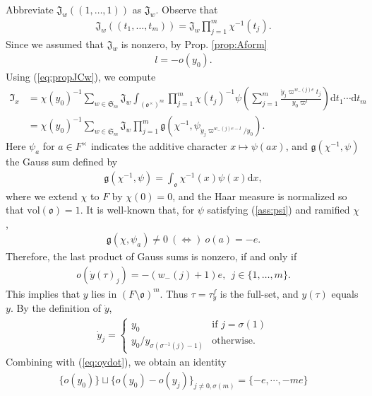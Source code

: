 \documentclass[11pt]{amsart}
\newcommand\s{\sigma}%
\newcommand\Vp{\varpi}%
\newcommand\vp{\varphi}%
\newcommand\oo{\mathfrak{o}}
\newcommand\Sf{{\mathfrak{S}}}
\newcommand\If{\mathfrak{I}}
\newcommand\Jf{\mathfrak{J}}
\newcommand\gf{\mathfrak{g}}
\newcommand\dr{\mathrm{d}}
\newcommand\1{\mathbf{1}}
\newcommand\tm{\times}
\newcommand\vol{{\mathrm{vol}}}
\numberwithin{equation}{section}
\begin{document}
Abbreviate $\Jf_w((1,\ldots,1))$ as $\Jf_w$.
Observe that
\begin{align}
\Jf_w((t_1,\ldots, t_m)) = \Jf_w \prod_{j=1}^{m} \chi^{-1}(t_j). \label{eq:propJCw}
\end{align} 
Since we assumed that $\Jf_{w}$ is nonzero, by Prop. \ref{prop:Aform} 
\begin{align}
l = - o(y_{0}). \label{eq:l-y0}
\end{align}
Using (\ref{eq:propJCw}), we compute 
\begin{align*}
\If_x &= \chi(y_0)^{-1} \sum_{w \in \Sf_{m}} \Jf_{w} \int_{(\oo^\tm)^m} \prod_{j=1}^{m}  \chi(t_j)^{-1} \psi\left(\sum_{j= 1}^{m} \frac{\dot{y}_{j}\Vp^{w_-(j)e} t_j}{y_{0}\Vp^l} \right) \dr t_1 \cdots \dr t_m \\
&= \chi(y_0)^{-1} \sum_{w \in \Sf_{m}} \Jf_{w} \prod_{j=1}^{m} \gf\left(\chi^{-1}, \psi_{\dot{y}_{j}\Vp^{w_-(j)e-l}/y_0}\right).
\end{align*}
Here $\psi_a$ for $a\in F^\tm$ indicates the additive character $x \mapsto \psi(ax)$, and $\gf(\chi^{-1},\psi)$ the Gauss sum defined by
\begin{align}
\gf(\chi^{-1},\psi) = \int_{\oo} \chi^{-1}(x) \psi(x) \dr x, \label{def:Gaussum}
\end{align} 
where we extend $\chi$ to $F$ by $\chi(0) = 0$, and the Haar measure is normalized so that $\vol(\oo) = 1$.
It is well-known that, for $\psi$ satisfying (\ref{ass:psi}) and ramified $\chi$, 
\begin{align}
\gf(\chi,\psi_a) \neq 0 \ (\Longleftrightarrow) \ o(a) = -e. \label{eq:GSsup}
\end{align} 
Therefore, the last product of Gauss sums is nonzero, if and only if   
\begin{align} 
o \left(\dot{y}(\tau)_{j}\right) = -(w_-(j)+1)e, \ \ j \in \{1, \ldots, m\}. \label{eq:oydot}
\end{align}
This implies that $y$ lies in $(F \setminus \oo)^{m}$.
Thus $\tau = \tau_y^f$ is the full-set, and $y(\tau)$ equals $y$.
By the definition of $\dot{y}$,
\begin{align}
\dot{y}_j = 
\begin{cases}
y_{0}& \mbox{if $j = \s(1)$} \\
y_{0}/y_{\s(\s^{-1}(j)-1)}& \mbox{otherwise.} 
\end{cases}
\label{eq:doty} 
\end{align} 
Combining with (\ref{eq:oydot}), we obtain an identity
\begin{align*}
\{ o(y_{0})\} \sqcup \{o(y_{0}) -o(y_{j}) \}_{j \neq 0, \s(m)} = \{ -e, \cdots, - m e\} 
\end{align*} 
\end{document}
